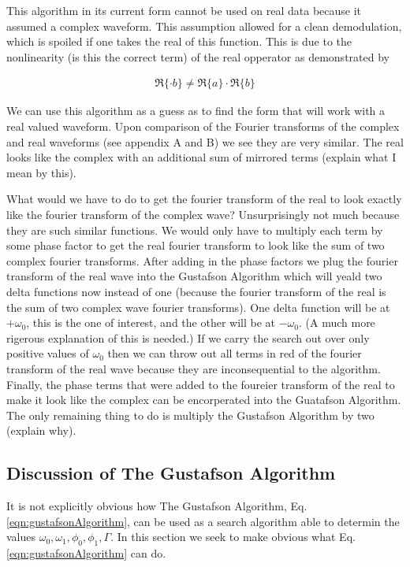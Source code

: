 \documentclass[onecolumn, groupedaddress, 10pt]{revtex4-1}
\begin{document}
This algorithm in its current form cannot be used on real data because it assumed a complex waveform.  This assumption allowed for a clean demodulation, which is spoiled if one takes the real of this function.  This is due to the nonlinearity (is this the correct term) of the real opperator as demonstrated by

\begin{align}
\Re \{  \cdot b \} \neq \Re \{ a \} \cdot \Re \{ b \}
\end{align}

We can use this algorithm as a guess as to find the form that will work with a real valued waveform.  Upon comparison of the Fourier transforms of the complex and real waveforms (see appendix A and B) we see they are very similar.  The real looks like the complex with an additional sum of mirrored terms (explain what I mean by this).

What would we have to do to get the fourier transform of the real to look exactly like the fourier transform of the complex wave?  Unsurprisingly not much because they are such similar functions.  We would only have to multiply each term by some phase factor to get the real fourier transform to look like the sum of two complex fourier transforms.  After adding in the phase factors we plug the  fourier transform of the real wave into the Gustafson Algorithm which will yeald two delta functions now instead of one (because the fourier transform of the real is the sum of two complex wave fourier transforms).  One delta function will be at $+\omega_0$, this is the one of interest, and the other will be at $-\omega_0$.  (A much more rigerous explanation of this is needed.)  If we carry the search out over only positive values of $\omega_0$ then we can throw out all terms in red of the fourier transform of the real wave because they are inconsequential to the algorithm.  Finally, the phase terms that were added to the foureier transform of the real to make it look like the complex can be encorperated into the Guatafson Algorithm.  The only remaining thing to do is multiply the Gustafson Algorithm by two (explain why).


\subsection{Discussion of The Gustafson Algorithm}
It is not explicitly obvious how The Gustafson Algorithm, Eq. \ref{eqn:gustafsonAlgorithm}, can be used as a search algorithm able to determin the values $\omega_0, \omega_1, \phi_0, \phi_1, \Gamma$.  In this section we seek to make obvious what Eq. \ref{eqn:gustafsonAlgorithm} can do.  
\end{document}
